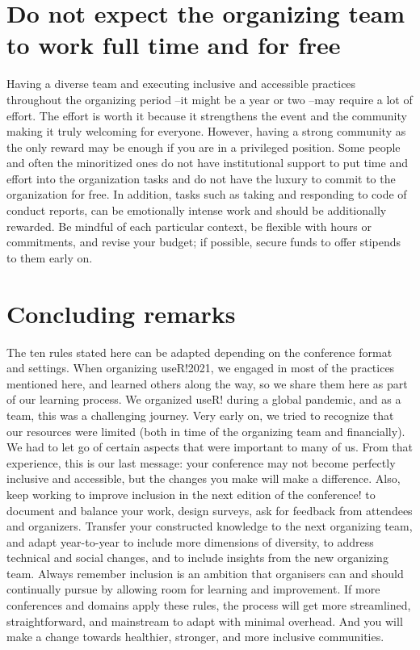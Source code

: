 \documentclass[10pt,letterpaper]{article}
\begin{document}
\section{Do not expect the organizing team to work full time and for free}
\label{rule_pay_team}

Having a diverse team and executing inclusive and accessible practices throughout the organizing period --it might be a year or two --may require a lot of effort. The effort is worth it because it strengthens the event and the community making it truly welcoming for everyone. However, having a strong community as the only reward may be enough if you are in a privileged position. Some people and often the minoritized ones do not have institutional support to put time and effort into the organization tasks and do not have the luxury to commit to the organization for free. In addition, tasks such as taking and responding to code of conduct reports, can be emotionally intense work and should be additionally rewarded. Be mindful of each particular context, be flexible with hours or commitments, and revise your budget; if possible, secure funds to offer stipends to them early on. 

\section*{Concluding remarks}

The ten rules stated here can be adapted depending on the conference format and settings.
When organizing useR!2021, we engaged in most of the practices mentioned here, and learned others along the way, so we share them here as part of our learning process. 
We organized useR! during a global pandemic, and as a team, this was a challenging journey. 
Very early on, we tried to recognize that our resources were limited (both in time of the organizing team and financially). 
We had to let go of certain aspects that were important to many of us. 
From that experience, this is our last message: your conference may not become perfectly inclusive and accessible, but the changes you make will make a difference.
Also, keep working to improve inclusion in the next edition of the conference! to document and balance your work, design surveys, ask for feedback from attendees and organizers. Transfer your constructed knowledge to the next organizing team, and adapt year-to-year to include more dimensions of diversity, to address technical and social changes, and to include insights from the new organizing team.  Always remember inclusion is an ambition that organisers can and should continually pursue by allowing room for learning and improvement.
If more conferences and domains apply these rules, the process will get more streamlined, straightforward, and mainstream to adapt with minimal overhead.
And you will make a change towards healthier, stronger, and more inclusive communities.
\end{document}
